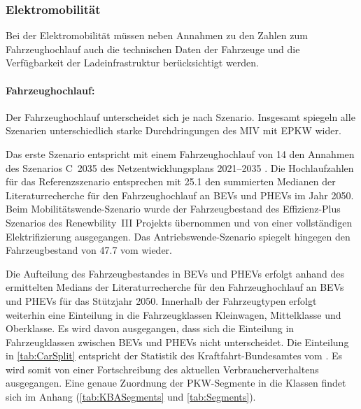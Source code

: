 \subsubsection{Elektromobilität}\label{chap:EMob_Szenarien}

Bei der Elektromobilität müssen neben Annahmen zu den Zahlen zum Fahrzeughochlauf auch die technischen Daten der Fahrzeuge und die Verfügbarkeit der Ladeinfrastruktur berücksichtigt werden.


\paragraph{Fahrzeughochlauf:}
Der Fahrzeughochlauf unterscheidet sich je nach Szenario.
Insgesamt spiegeln alle Szenarien unterschiedlich starke Durchdringungen des \gls{MIV} mit \gls{EPKW} wider.\medskip

Das erste Szenario entspricht mit einem Fahrzeughochlauf von \SI{14}{\MioStk} den Annahmen des Szenarios C~\num{2035} des Netzentwicklungsplans \numrange[range-phrase=~{--}~]{2021}{2035} \cite{BNetzA2020}.
Die Hochlaufzahlen für das Referenzszenario entsprechen mit \SI{25.1}{\MioStk} den summierten Medianen der Literaturrecherche für den Fahrzeughochlauf an \glspl{BEV} und \glspl{PHEV} im Jahr \num{2050}.
Beim Mobilitätswende-Szenario wurde der Fahrzeugbestand des Effizienz-Plus Szenarios des Renewbility~III Projekts \cite{Institut2016} übernommen und von einer vollständigen Elektrifizierung ausgegangen.
Das Antriebswende-Szenario spiegelt hingegen den Fahrzeugbestand von \SI{47.7}{\MioStk} vom  \cite{KBA2020} wieder.



Die Aufteilung des Fahrzeugbestandes in \glspl{BEV} und \glspl{PHEV} erfolgt anhand des ermittelten Medians der Literaturrecherche für den Fahrzeughochlauf an \glspl{BEV} und \glspl{PHEV} für das Stützjahr \num{2050}.
Innerhalb der Fahrzeugtypen erfolgt weiterhin eine Einteilung in die Fahrzeugklassen Kleinwagen, Mittelklasse und Oberklasse.
Es wird davon ausgegangen, dass sich die Einteilung in Fahrzeugklassen zwischen \glspl{BEV} und \glspl{PHEV} nicht unterscheidet.
Die Einteilung in \autoref{tab:CarSplit} entspricht der Statistik des Kraftfahrt-Bundesamtes \cite{KBASegments2020} vom .
Es wird somit von einer Fortschreibung des aktuellen Verbraucherverhaltens ausgegangen.
Eine genaue Zuordnung der \gls{PKW}-Segmente in die Klassen findet sich im Anhang (\autoref{tab:KBASegments} und \autoref{tab:Segments}).


